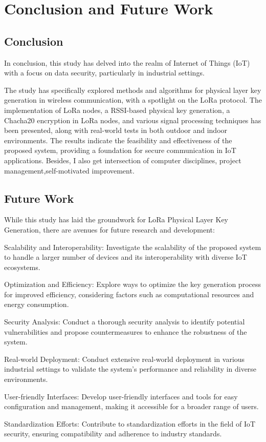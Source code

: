 
\chapter{Conclusion and Future Work}

\section{Conclusion}
In conclusion, this study has delved into the realm of Internet of Things (IoT) with a focus on data security, particularly in industrial settings. 

The study has specifically explored methods and algorithms for physical layer key generation in wireless communication, with a spotlight on the LoRa protocol. The implementation of LoRa nodes, a RSSI-based physical key generation, a Chacha20 encryption in LoRa nodes, and various signal processing techniques has been presented, along with real-world tests in both outdoor and indoor environments. The results indicate the feasibility and effectiveness of the proposed system, providing a foundation for secure communication in IoT applications. Besides, I also get intersection of computer disciplines, project management\footnotemark,self-motivated improvement.


\section{Future Work}

While this study has laid the groundwork for LoRa Physical Layer Key Generation, there are avenues for future research and development:

Scalability and Interoperability: Investigate the scalability of the proposed system to handle a larger number of devices and its interoperability with diverse IoT ecosystems.

Optimization and Efficiency: Explore ways to optimize the key generation process for improved efficiency, considering factors such as computational resources and energy consumption.

Security Analysis: Conduct a thorough security analysis to identify potential vulnerabilities and propose countermeasures to enhance the robustness of the system.


Real-world Deployment: Conduct extensive real-world deployment in various industrial settings to validate the system's performance and reliability in diverse environments.

User-friendly Interfaces: Develop user-friendly interfaces and tools for easy configuration and management, making it accessible for a broader range of users.

Standardization Efforts: Contribute to standardization efforts in the field of IoT security, ensuring compatibility and adherence to industry standards.